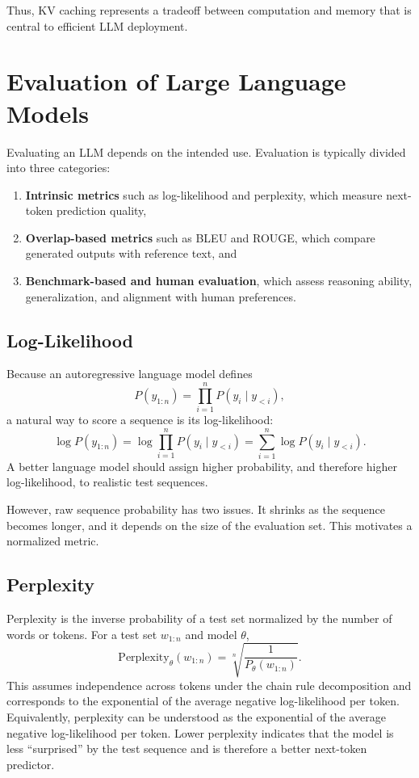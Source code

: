 \documentclass{article}
\begin{document}
Thus, KV caching represents a tradeoff between computation and memory that is central to efficient LLM deployment.

\section{Evaluation of Large Language Models}

Evaluating an LLM depends on the intended use. Evaluation is typically divided into three categories:
\begin{enumerate}
    \item \textbf{Intrinsic metrics} such as log-likelihood and perplexity, which measure next-token prediction quality,
    \item \textbf{Overlap-based metrics} such as BLEU and ROUGE, which compare generated outputs with reference text, and
    \item \textbf{Benchmark-based and human evaluation}, which assess reasoning ability, generalization, and alignment with human preferences.
\end{enumerate}

\subsection{Log-Likelihood}
Because an autoregressive language model defines
\[
P(y_{1:n}) = \prod_{i=1}^{n} P(y_i\mid y_{<i}),
\]
a natural way to score a sequence is its log-likelihood:
\begin{equation}
\log P(y_{1:n}) = \log \prod_{i=1}^{n} P(y_i\mid y_{<i})
= \sum_{i=1}^{n} \log P(y_i\mid y_{<i}).
\end{equation}
A better language model should assign higher probability, and therefore higher log-likelihood, to realistic test sequences.

However, raw sequence probability has two issues. It shrinks as the sequence becomes longer, and it depends on the size of the evaluation set. This motivates a normalized metric.

\subsection{Perplexity}
Perplexity is the inverse probability of a test set normalized by the number of words or tokens. For a test set $w_{1:n}$ and model $\theta$,
\begin{equation}
\mathrm{Perplexity}_\theta(w_{1:n}) = \sqrt[n]{\frac{1}{P_\theta(w_{1:n})}}.
\end{equation}
This assumes independence across tokens under the chain rule decomposition and corresponds to the exponential of the average negative log-likelihood per token. Equivalently, perplexity can be understood as the exponential of the average negative log-likelihood per token. Lower perplexity indicates that the model is less ``surprised'' by the test sequence and is therefore a better next-token predictor.
\end{document}
